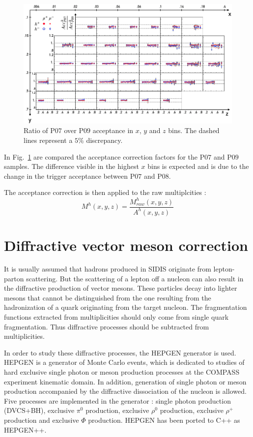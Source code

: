 \begin{figure}
  \centering
	\includegraphics[scale=0.6]{./gfx/SysAcc.png}
	\caption{Ratio of P$07$ over P$09$ acceptance in $x$, $y$ and $z$ bins. The dashed lines represent a $5$\% discrepancy.}
	\label{pic:AccPer}
\end{figure}

In Fig.~\ref{pic:AccPer} are compared the acceptance correction factors for the P$07$ and P$09$ samples. The difference visible in the highest $x$ bins is expected and is due to the change in the trigger acceptance between P$07$ and P$08$.

The acceptance correction is then applied to the raw multiplcities :
%
\begin{equation}
  M^h(x,y,z) = \frac{M^h_{raw}(x,y,z)}{A^h(x,y,z)}
\end{equation}
%

\section{Diffractive vector meson correction} \label{sec:DVMf}

It is usually assumed that hadrons produced in SIDIS originate from lepton-parton scattering. But the scattering of a lepton off a nucleon can also result in the diffractive production of vector mesons. These particles decay into lighter mesons that cannot be distinguished from the one resulting from the hadronization of a quark originating from the target nucleon. The fragmentation functions extracted from multiplicities should only come from single quark fragmentation. Thus diffractive processes should be subtracted from multiplicities.

In order to study these diffractive processes, the HEPGEN generator is used. HEPGEN \cite{HEPGEN} is a generator of Monte Carlo events, which is dedicated to studies of hard exclusive single photon or meson production processes at the COMPASS experiment kinematic domain. In addition, generation of single photon or meson production accompanied by the diffractive dissociation of the nucleon is allowed. Five processes are implemented in the generator : single photon production (DVCS+BH), exclusive $\pi^0$ production, exclusive $\rho^0$ production, exclusive $\rho^+$ production and exclusive $\Phi$ production. HEPGEN has been ported to C++ as HEPGEN++.

